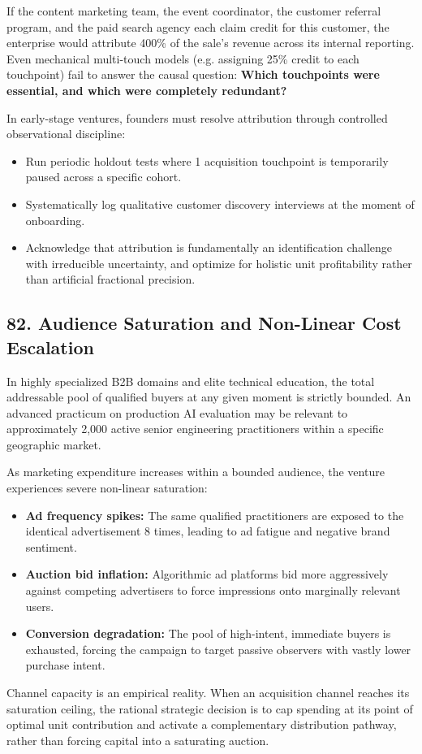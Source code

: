 If the content marketing team, the event coordinator, the customer referral program, and the paid search agency each claim credit for this customer, the enterprise would attribute 400\% of the sale's revenue across its internal reporting. Even mechanical multi-touch models (e.g. assigning 25\% credit to each touchpoint) fail to answer the causal question: \textbf{Which touchpoints were essential, and which were completely redundant?}

In early-stage ventures, founders must resolve attribution through controlled observational discipline:
\begin{itemize}[leftmargin=*,itemsep=1pt]
  \item Run periodic holdout tests where 1 acquisition touchpoint is temporarily paused across a specific cohort.
  \item Systematically log qualitative customer discovery interviews at the moment of onboarding.
  \item Acknowledge that attribution is fundamentally an identification challenge with irreducible uncertainty, and optimize for holistic unit profitability rather than artificial fractional precision.
\end{itemize}

\subsection*{82. Audience Saturation and Non-Linear Cost Escalation}

In highly specialized B2B domains and elite technical education, the total addressable pool of qualified buyers at any given moment is strictly bounded. An advanced practicum on production AI evaluation may be relevant to approximately 2,000 active senior engineering practitioners within a specific geographic market.

As marketing expenditure increases within a bounded audience, the venture experiences severe non-linear saturation:
\begin{itemize}[leftmargin=*,itemsep=1pt]
  \item \textbf{Ad frequency spikes:} The same qualified practitioners are exposed to the identical advertisement 8 times, leading to ad fatigue and negative brand sentiment.
  \item \textbf{Auction bid inflation:} Algorithmic ad platforms bid more aggressively against competing advertisers to force impressions onto marginally relevant users.
  \item \textbf{Conversion degradation:} The pool of high-intent, immediate buyers is exhausted, forcing the campaign to target passive observers with vastly lower purchase intent.
\end{itemize}

Channel capacity is an empirical reality. When an acquisition channel reaches its saturation ceiling, the rational strategic decision is to cap spending at its point of optimal unit contribution and activate a complementary distribution pathway, rather than forcing capital into a saturating auction.
